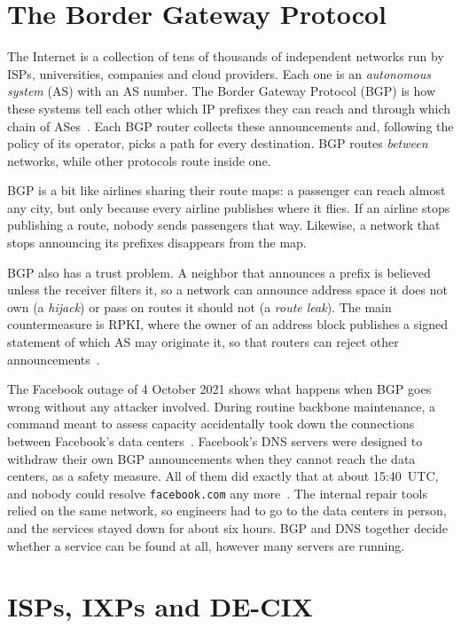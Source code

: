 \section{The Border Gateway Protocol}\label{sec:bgp}

The Internet is a collection of tens of thousands of independent networks run by ISPs, universities, companies and cloud providers. Each one is an \emph{autonomous system} (AS) with an AS number. The Border Gateway Protocol (BGP) is how these systems tell each other which IP prefixes they can reach and through which chain of ASes~\cite{rfc4271}. Each BGP router collects these announcements and, following the policy of its operator, picks a path for every destination. BGP routes \emph{between} networks, while other protocols route inside one.

BGP is a bit like airlines sharing their route maps: a passenger can reach almost any city, but only because every airline publishes where it flies. If an airline stops publishing a route, nobody sends passengers that way. Likewise, a network that stops announcing its prefixes disappears from the map.

BGP also has a trust problem. A neighbor that announces a prefix is believed unless the receiver filters it, so a network can announce address space it does not own (a \emph{hijack}) or pass on routes it should not (a \emph{route leak}). The main countermeasure is RPKI, where the owner of an address block publishes a signed statement of which AS may originate it, so that routers can reject other announcements~\cite{rfc6480}.

The Facebook outage of 4 October 2021 shows what happens when BGP goes wrong without any attacker involved. During routine backbone maintenance, a command meant to assess capacity accidentally took down the connections between Facebook's data centers~\cite{meta_outage}. Facebook's DNS servers were designed to withdraw their own BGP announcements when they cannot reach the data centers, as a safety measure. All of them did exactly that at about 15:40~UTC, and nobody could resolve \texttt{facebook.com} any more~\cite{cf_facebook}. The internal repair tools relied on the same network, so engineers had to go to the data centers in person, and the services stayed down for about six hours. BGP and DNS together decide whether a service can be found at all, however many servers are running.

\section{ISPs, IXPs and DE-CIX}\label{sec:ixp}

